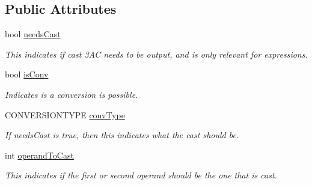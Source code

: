 \subsection*{Public Attributes}
\begin{DoxyCompactItemize}
\item 
\hypertarget{classAST_aaf215802de409f8096c063d01ffa6783}{bool \hyperlink{classAST_aaf215802de409f8096c063d01ffa6783}{needs\-Cast}}\label{classAST_aaf215802de409f8096c063d01ffa6783}

\begin{DoxyCompactList}\small\item\em This indicates if cast 3\-A\-C needs to be output, and is only relevant for expressions. \end{DoxyCompactList}\item 
\hypertarget{classAST_afa9e77ef650ec6664458fa6cb55be985}{bool \hyperlink{classAST_afa9e77ef650ec6664458fa6cb55be985}{is\-Conv}}\label{classAST_afa9e77ef650ec6664458fa6cb55be985}

\begin{DoxyCompactList}\small\item\em Indicates is a conversion is possible. \end{DoxyCompactList}\item 
\hypertarget{classAST_a61ef3317e023d45237e06615b387cd6b}{C\-O\-N\-V\-E\-R\-S\-I\-O\-N\-T\-Y\-P\-E \hyperlink{classAST_a61ef3317e023d45237e06615b387cd6b}{conv\-Type}}\label{classAST_a61ef3317e023d45237e06615b387cd6b}

\begin{DoxyCompactList}\small\item\em If needs\-Cast is true, then this indicates what the cast should be. \end{DoxyCompactList}\item 
\hypertarget{classAST_aea9b07b39d24183f38c0029cec0a878e}{int \hyperlink{classAST_aea9b07b39d24183f38c0029cec0a878e}{operand\-To\-Cast}}\label{classAST_aea9b07b39d24183f38c0029cec0a878e}

\begin{DoxyCompactList}\small\item\em This indicates if the first or second operand should be the one that is cast. \end{DoxyCompactList}\end{DoxyCompactItemize}
